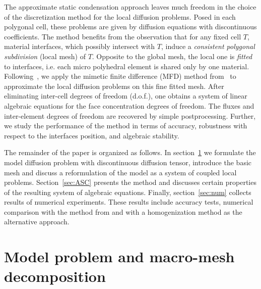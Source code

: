 \documentclass[12pt]{article}
\begin{document}
The approximate static condensation approach leaves much freedom in the choice of the discretization method for the local diffusion problems.  Posed in each polygonal cell, these problems are given by  diffusion equations with  discontinuous coefficients. The method benefits from the observation that   for any fixed cell $T$,  material interfaces, which possibly intersect with $T$,  induce a \emph{consistent polygonal subdivision} (local mesh) of $T$. Opposite to the global mesh, the local one is \emph{fitted} to interfaces, i.e. each micro polyhedral element is shared only by one material. Following~\cite{kikinzon2017approximate}, we apply the mimetic finite difference (MFD) method from~\cite{lipnikov2014mimetic} to approximate the local diffusion problems on this fine fitted mesh.
	After eliminating inter-cell degrees of freedom (d.o.f.), one obtains a system of linear algebraic equations for the face concentration degrees of freedom. The fluxes and inter-element degrees of freedom are recovered by simple postprocessing. Further, we study the performance of the method in terms of accuracy, robustness with respect to the interfaces position,  and algebraic stability.
	
	The remainder of the paper is organized as follows. In section~\ref{sec:model} we formulate the model diffusion problem with discontinuous diffusion tensor, introduce the basic mesh and discuss a reformulation of the model as a system of coupled local problems. Section~\ref{sec:ASC} presents the method and discusses certain  properties of the resulting  system of algebraic equations. Finally, section~\ref{sec:num} collects results of numerical experiments. These results include accuracy tests, numerical comparison with the method from  \cite{kikinzon2017approximate} and with a homogenization method as the alternative approach.
	
	\section{Model problem and macro-mesh decomposition} \label{sec:model}
	
\end{document}
